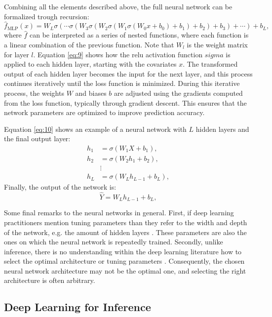Combining all the elements described above, the full neural network can be formalized trough recursion:
\begin{equation}
\hat{f}_{\text{MLP}}(x) = W_L \sigma \left( \cdots \sigma \left( W_3 \sigma \left( W_2 \sigma \left( W_1 \sigma \left( W_0 x + b_0 \right) + b_1 \right) + b_2 \right) + b_3 \right) + \cdots \right) + b_L,
\label{eq:9}
\end{equation}
where $\hat{f}$ can be interpreted as a series of nested functions, where each function is a linear combination of the previous function.
Note that $W_l$ is the weight matrix for layer $l$.
Equation \ref{eq:9} shows how the \ac{relu} activation function $sigma$ is applied to each hidden layer, starting with the covariates $x$.
The transformed output of each hidden layer becomes the input for the next layer, and this process continues iteratively until the loss function is minimized.
During this iterative process, the weights $W$ and biases $b$ are adjusted using the gradients computed from the loss function, typically through gradient descent.
This ensures that the network parameters are optimized to improve prediction accuracy.

Equation \ref{eq:10} shows an example of a neural network with $L$ hidden layers and the final output layer:
\begin{align}
h_1 &= \sigma(W_1 X + b_1), \nonumber \\
h_2 &= \sigma(W_2 h_1 + b_2), \nonumber  \\
&\vdots \nonumber \\
h_L &= \sigma(W_L h_{L-1} + b_L),
\label{eq:10}
\end{align}
Finally, the output of the network is:
\begin{equation}
\hat{Y} = W_L h_{L-1} + b_L, \nonumber
\end{equation}



Some final remarks to the neural networks in general.
First, if deep learning practitioners mention tuning parameters than they refer to the width and depth of the network, e.g. the amount of hidden layers \citep{farrellDeepNeuralNetworks2021}.
These parameters are also the ones on which the neural network is repeatedly trained.
Secondly, unlike inference, there is no understanding within the deep learning literature how to select the optimal architecture or tuning parameters \citep[see][]{10.1214/19-AOS1875,telgarsky2016benefits}.
Consequently, the chosen neural network architecture may not be the optimal one, and selecting the right architecture is often arbitrary.
\subsection{Deep Learning for Inference}






